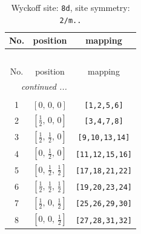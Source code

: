 \documentclass[fleqn,8pt]{jsarticle}
\begin{document}
\begin{longtable}{ccc}
\caption{Wyckoff site: {\tt 8d}, site symmetry: {\tt 2/m..}}
 \\
 \hline \hline
No. & position & mapping \\ \hline \endfirsthead

\multicolumn{2}{l}{\tablename\ \thetable{}} \\
 \hline \hline
No. & position & mapping \\ \hline \endhead

 \hline \hline
\multicolumn{2}{r}{\footnotesize\it continued ...} \\ \endfoot

 \hline \hline
\multicolumn{2}{r}{} \\ \endlastfoot

1 & $\left[ 0,\, 0,\, 0 \right]$ & {\tt [1,2,5,6]} \\ \hline
2 & $\left[ \frac{1}{2},\, 0,\, 0 \right]$ & {\tt [3,4,7,8]} \\ \hline
3 & $\left[ \frac{1}{2},\, \frac{1}{2},\, 0 \right]$ & {\tt [9,10,13,14]} \\ \hline
4 & $\left[ 0,\, \frac{1}{2},\, 0 \right]$ & {\tt [11,12,15,16]} \\ \hline
5 & $\left[ 0,\, \frac{1}{2},\, \frac{1}{2} \right]$ & {\tt [17,18,21,22]} \\ \hline
6 & $\left[ \frac{1}{2},\, \frac{1}{2},\, \frac{1}{2} \right]$ & {\tt [19,20,23,24]} \\ \hline
7 & $\left[ \frac{1}{2},\, 0,\, \frac{1}{2} \right]$ & {\tt [25,26,29,30]} \\ \hline
8 & $\left[ 0,\, 0,\, \frac{1}{2} \right]$ & {\tt [27,28,31,32]} \\
\end{longtable}
\renewcommand{\arraystretch}{1.2}
\end{document}
